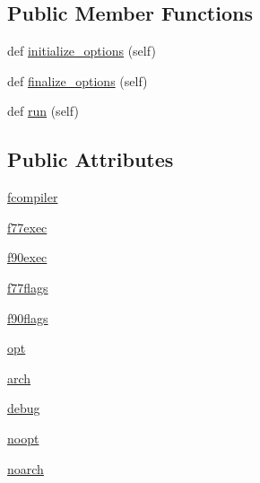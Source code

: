 \subsection*{Public Member Functions}
\begin{DoxyCompactItemize}
\item 
def \hyperlink{classnumpy_1_1distutils_1_1command_1_1config__compiler_1_1config__fc_a5dcf4182435453a731b16769ea466d0f}{initialize\+\_\+options} (self)
\item 
def \hyperlink{classnumpy_1_1distutils_1_1command_1_1config__compiler_1_1config__fc_aab6527090fbbf5c72ead1233775c75af}{finalize\+\_\+options} (self)
\item 
def \hyperlink{classnumpy_1_1distutils_1_1command_1_1config__compiler_1_1config__fc_abb2c1f962231029ab9f93e84db16fecf}{run} (self)
\end{DoxyCompactItemize}
\subsection*{Public Attributes}
\begin{DoxyCompactItemize}
\item 
\hyperlink{classnumpy_1_1distutils_1_1command_1_1config__compiler_1_1config__fc_a76b723d72c7f49e8b9e7a70efe42cea7}{fcompiler}
\item 
\hyperlink{classnumpy_1_1distutils_1_1command_1_1config__compiler_1_1config__fc_af9482ee27db1281f4a00ef2267f3ce68}{f77exec}
\item 
\hyperlink{classnumpy_1_1distutils_1_1command_1_1config__compiler_1_1config__fc_ab6d832f7b411bc2479d75bc20275069f}{f90exec}
\item 
\hyperlink{classnumpy_1_1distutils_1_1command_1_1config__compiler_1_1config__fc_a2ee3b97bfbd0505db000eb740a7e7f07}{f77flags}
\item 
\hyperlink{classnumpy_1_1distutils_1_1command_1_1config__compiler_1_1config__fc_ac2a782109853b470e34e91b520c3c954}{f90flags}
\item 
\hyperlink{classnumpy_1_1distutils_1_1command_1_1config__compiler_1_1config__fc_a6334f4f4c2a39f7aa32fe1cc28198f5a}{opt}
\item 
\hyperlink{classnumpy_1_1distutils_1_1command_1_1config__compiler_1_1config__fc_ac9782c3fd6e0f844485c148b47e9ccb3}{arch}
\item 
\hyperlink{classnumpy_1_1distutils_1_1command_1_1config__compiler_1_1config__fc_ab1243ed578f2399299ef797f1b967f82}{debug}
\item 
\hyperlink{classnumpy_1_1distutils_1_1command_1_1config__compiler_1_1config__fc_accb16d9560ca876de33afd4acd8ee280}{noopt}
\item 
\hyperlink{classnumpy_1_1distutils_1_1command_1_1config__compiler_1_1config__fc_ab580e556c744fa3518bad804cfed8ac7}{noarch}
\end{DoxyCompactItemize}
